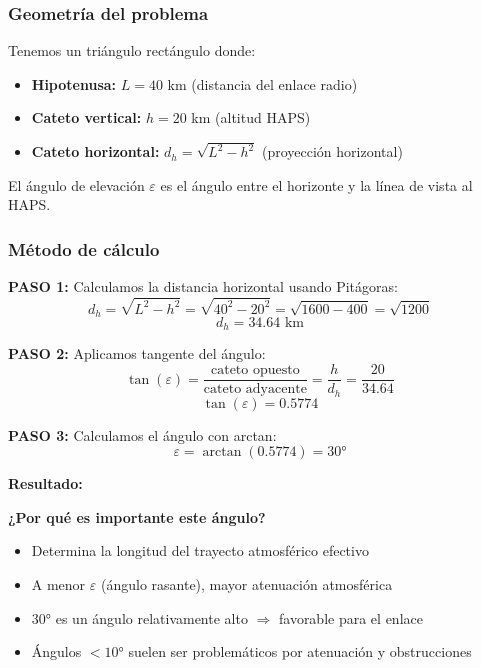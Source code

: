 \documentclass[a4paper,10pt]{article}
\begin{document}
\subsubsection{Geometría del problema}

\begin{center}
\begin{tcolorbox}[colback=yellow!10!white,colframe=orange!75!black,title=Geometría del enlace HAPS]
Tenemos un triángulo rectángulo donde:
\begin{itemize}
    \item \textbf{Hipotenusa:} $L = 40$ km (distancia del enlace radio)
    \item \textbf{Cateto vertical:} $h = 20$ km (altitud HAPS)
    \item \textbf{Cateto horizontal:} $d_h = \sqrt{L^2 - h^2}$ (proyección horizontal)
\end{itemize}

El ángulo de elevación $\varepsilon$ es el ángulo entre el horizonte y la línea de vista al HAPS.
\end{tcolorbox}
\end{center}

\subsubsection{Método de cálculo}

\textbf{PASO 1:} Calculamos la distancia horizontal usando Pitágoras:
$$d_h = \sqrt{L^2 - h^2} = \sqrt{40^2 - 20^2} = \sqrt{1600 - 400} = \sqrt{1200}$$
$$d_h = 34.64 \text{ km}$$

\textbf{PASO 2:} Aplicamos tangente del ángulo:
$$\tan(\varepsilon) = \frac{\text{cateto opuesto}}{\text{cateto adyacente}} = \frac{h}{d_h} = \frac{20}{34.64}$$
$$\tan(\varepsilon) = 0.5774$$

\textbf{PASO 3:} Calculamos el ángulo con arctan:
$$\varepsilon = \arctan(0.5774) = \boxed{30°}$$

\textbf{Resultado:} 

\textbf{¿Por qué es importante este ángulo?}
\begin{itemize}
    \item Determina la longitud del trayecto atmosférico efectivo
    \item A menor $\varepsilon$ (ángulo rasante), mayor atenuación atmosférica
    \item 30° es un ángulo relativamente alto $\Rightarrow$ favorable para el enlace
    \item Ángulos $< 10°$ suelen ser problemáticos por atenuación y obstrucciones
\end{itemize}
\end{document}
